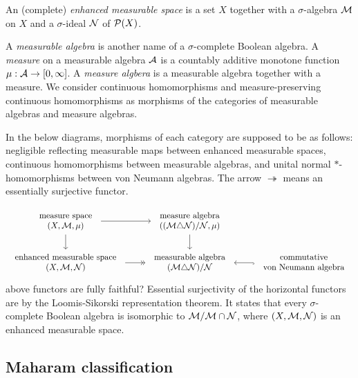 \documentclass{../../large}
\begin{document}
\begin{defn*}
An (complete) \emph{enhanced measurable space} is a set $X$ together with a $\sigma$-algebra $\mathcal{M}$ on $X$ and a $\sigma$-ideal $\mathcal{N}$ of $\mathcal{P}(X)$.
\end{defn*}
\begin{defn*}
A \emph{measurable algebra} is another name of a $\sigma$-complete Boolean algebra.
A \emph{measure} on a measurable algebra $\mathcal{A}$ is a countably additive monotone function $\mu:\mathcal{A}\to[0,\infty]$.
A \emph{measure algbera} is a measurable algebra together with a measure.
We consider continuous homomorphisms and measure-preserving continuous homomorphisms as morphisms of the categories of measurable algebras and measure algebras.
\end{defn*}

In the below diagrams, morphisms of each category are supposed to be as follows: negligible reflecting measurable maps between enhanced measurable spaces, continuous homomorphisms between measurable algebras, and unital normal $*$-homomorphisms between von Neumann algebras.
The arrow $\twoheadrightarrow$ means an essentially surjective functor.

\[\begin{tikzcd}
\tab{measure space\\$(X,\cM,\mu)$} \rar\dar &
\tab{measure algebra\\$((\cM\triangle\cN)/\cN,\mu)$} \dar \\
\tab{enhanced measurable space\\$(X,\cM,\cN)$} \rar[->>] &
\tab{measurable algebra\\$(\cM\triangle\cN)/\cN$} &
\tab{commutative\\von Neumann algebra} \lar[hook]
\end{tikzcd}\]
above functors are fully faithful?
Essential surjectivity of the horizontal functors are by the Loomis-Sikorski representation theorem.
It states that every $\sigma$-complete Boolean algebra is isomorphic to $\mathcal{M}/\mathcal{M}\cap\mathcal{N}$, where $(X,\mathcal{M},\mathcal{N})$ is an enhanced measurable space.

\begin{prb}
\end{prb}


\subsection{Maharam classification}
\end{document}

